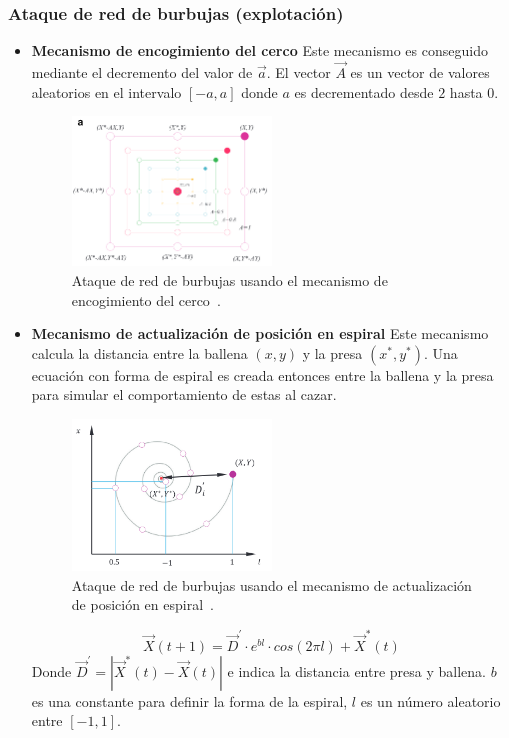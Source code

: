 \subsubsection{Ataque de red de burbujas (explotación)}
\begin{itemize}
    \item \textbf{Mecanismo de encogimiento del cerco}
          Este mecanismo es conseguido mediante el decremento del valor de $\vec{a}$. El vector $\vec{A}$ es un vector de valores aleatorios en el intervalo $[-a,a]$ donde $a$ es decrementado desde $2$ hasta $0$.
          \begin{figure}[htp]
              \centering
              \includegraphics[width=0.5\textwidth]{imagenes/wao-shrinking-circle-prey-mechanism.png}
              \caption[Mecanismo de encogimiento del cerco]{Ataque de red de burbujas usando el mecanismo de encogimiento del cerco~\cite{mirjalili_whale_2016}.}
          \end{figure}

    \item \textbf{Mecanismo de actualización de posición en espiral}
          Este mecanismo calcula la distancia entre la ballena $(x,y)$ y la presa $(x^*, y^*)$. Una ecuación con forma de espiral es creada entonces entre la ballena y la presa para simular el comportamiento de estas al cazar.
          \begin{figure}[htp]
              \centering
              \includegraphics[width=0.5\textwidth]{imagenes/spiral-update-position-wao.png}
              \caption[Mecanismo de actualización de posición en espiral]{Ataque de red de burbujas usando el mecanismo de actualización de posición en espiral~\cite{mirjalili_whale_2016}.}
          \end{figure}

          \begin{equation}
              \vec{X}(t+1)=\vec{D}^{'}\cdot e^{bl}\cdot cos(2\pi l)+\vec{X}^*(t)
          \end{equation}
          Donde $\vec{D}^{'}=|\vec{X}^*(t)-\vec{X}(t)|$ e indica la distancia entre presa y ballena. $b$ es una constante para definir la forma de la espiral, $l$ es un número aleatorio entre $[-1,1]$.
\end{itemize}

